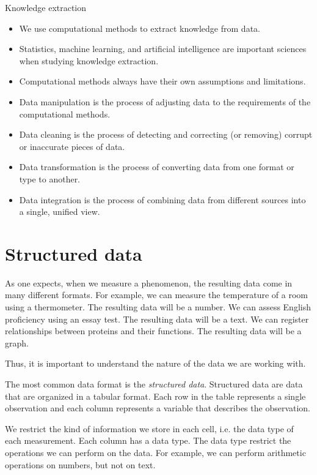 \begin{slidebox}{Knowledge extraction}{}
  \begin{itemize}
    \item We use computational methods to extract knowledge from data.
    \item Statistics, machine learning, and artificial intelligence are important
      sciences when studying knowledge extraction.
    \item Computational methods always have their own assumptions and limitations.
    \item Data manipulation is the process of adjusting data to the requirements of the
      computational methods.
    \item Data cleaning is the process of detecting and correcting (or removing) corrupt
      or inaccurate pieces of data.
    \item Data transformation is the process of converting data from one format or type
      to another.
    \item Data integration is the process of combining data from different sources into
      a single, unified view.
  \end{itemize}
\end{slidebox}

\section{Structured data}

As one expects, when we measure a phenomenon, the resulting data come in many different
formats.  For example, we can measure the temperature of a room using a thermometer.  The
resulting data will be a number.  We can assess English proficiency using an essay test.  The
resulting data will be a text.  We can register relationships between proteins and
their functions.  The resulting data will be a graph.

Thus, it is important to understand the nature of the data we are working with.

The most common data format is the \emph{structured data}.  Structured data are data that
are organized in a tabular format.  Each row in the table represents a single observation
and each column represents a variable that describes the observation.

We restrict the kind of information we store in each cell, i.e. the data type of each
measurement.  Each column has a data type.  The data type restrict the operations we can
perform on the data.  For example, we can perform arithmetic operations on numbers, but
not on text.

